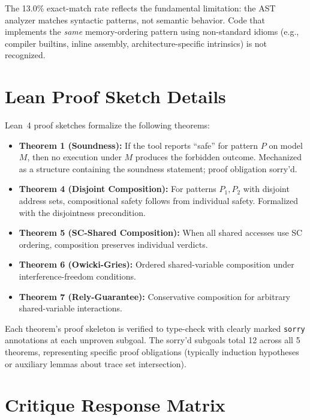 \documentclass[11pt]{article}
\begin{document}
The 13.0\% exact-match rate reflects the fundamental limitation:
the AST analyzer matches syntactic patterns, not semantic behavior.
Code that implements the \emph{same} memory-ordering pattern using
non-standard idioms (e.g., compiler builtins, inline assembly,
architecture-specific intrinsics) is not recognized.

\section{Lean Proof Sketch Details}
\label{app:lean-details}

Lean~4 proof sketches formalize the following theorems:

\begin{itemize}[nosep]
\item \textbf{Theorem 1 (Soundness):} If the tool reports
  ``safe'' for pattern $P$ on model $M$, then no execution under
  $M$ produces the forbidden outcome. Mechanized as a structure
  containing the soundness statement; proof obligation sorry'd.
\item \textbf{Theorem 4 (Disjoint Composition):} For patterns
  $P_1, P_2$ with disjoint address sets, compositional safety
  follows from individual safety.  Formalized with the disjointness
  precondition.
\item \textbf{Theorem 5 (SC-Shared Composition):} When all shared
  accesses use SC ordering, composition preserves individual verdicts.
\item \textbf{Theorem 6 (Owicki-Gries):} Ordered shared-variable
  composition under interference-freedom conditions.
\item \textbf{Theorem 7 (Rely-Guarantee):} Conservative composition
  for arbitrary shared-variable interactions.
\end{itemize}

Each theorem's proof skeleton is verified to type-check with
clearly marked \texttt{sorry} annotations at each unproven subgoal.
The sorry'd subgoals total 12 across all 5 theorems, representing
specific proof obligations (typically induction hypotheses or
auxiliary lemmas about trace set intersection).

\section{Critique Response Matrix}
\label{app:critique-response}
\end{document}
